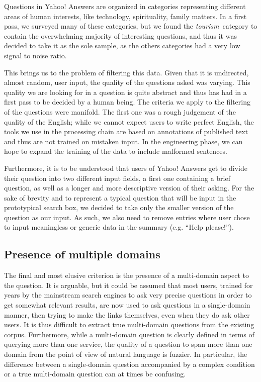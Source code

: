 Questions in Yahoo! Answers are organized in categories representing different areas of human interests, like technology, spirituality, family matters. In a first pass, we surveyed many of these categories, but we found the \emph{tourism}\ category to contain the overwhelming majority of interesting questions, and thus it was decided to take it as the sole sample, as the others categories had a very low signal to noise ratio.

This brings us to the problem of filtering this data. Given that it is undirected, almost random, user input, the quality of the questions asked was varying. This quality we are looking for in a question is quite abstract and thus has had in a first pass to be decided by a human being. The criteria we apply to the filtering of the questions were manifold. The first one was a rough judgement of the quality of the English; while we cannot expect users to write perfect English, the tools we use in the processing chain are based on annotations of published text and thus are not trained on mistaken input. In the engineering phase, we can hope to expand the training of the data to include malformed sentences.

Furthermore, it is to be understood that users of Yahoo! Answers get to divide their question into two different input fields, a first one containing a brief question, as well as a longer and more descriptive version of their asking. For the sake of brevity and to represent a typical question that will be input in the prototypical search box, we decided to take only the smaller version of the question as our input. As such, we also need to remove entries where user chose to input meaningless or generic data in the summary (e.g. ``Help please!'').


\subsection{Presence of multiple domains} %
\label{sub:presence_of_multiple_domains}

The final and most elusive criterion is the presence of a multi-domain aspect to the question. It is arguable, but it could be assumed that most users, trained for years by the mainstream search engines to ask very precise questions in order to get somewhat relevant results, are now used to ask questions in a single-domain manner, then trying to make the links themselves, even when they do ask other users. It is thus difficult to extract true multi-domain questions from the existing corpus. Furthermore, while a multi-domain question is clearly defined in terms of querying more than one service, the quality of a question to span more than one domain from the point of view of natural language is fuzzier. In particular, the difference between a single-domain question accompanied by a complex condition or a true multi-domain question can at times be confusing.

